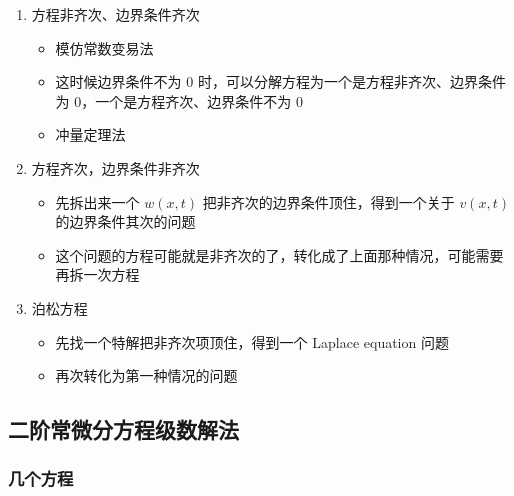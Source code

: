 \documentclass{article}
\begin{document}
\begin{enumerate}
    \item 方程非齐次、边界条件齐次 \begin{itemize}
              \item 模仿常数变易法
              \item 这时候边界条件不为 0 时，可以分解方程为一个是方程非齐次、边界条件为 0，一个是方程齐次、边界条件不为 0
              \item 冲量定理法
          \end{itemize}
    \item 方程齐次，边界条件非齐次 \begin{itemize}
              \item 先拆出来一个 $w(x, t)$ 把非齐次的边界条件顶住，得到一个关于 $v(x, t)$ 的边界条件其次的问题
              \item 这个问题的方程可能就是非齐次的了，转化成了上面那种情况，可能需要再拆一次方程
          \end{itemize}
    \item 泊松方程 \begin{itemize}
              \item 先找一个特解把非齐次项顶住，得到一个 Laplace equation 问题
              \item 再次转化为第一种情况的问题
          \end{itemize}
\end{enumerate}

\subsection{二阶常微分方程级数解法}

\subsubsection{几个方程}
\end{document}
